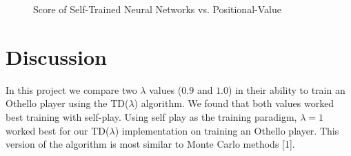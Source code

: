 \documentclass{sig-alternate-05-2015}
\begin{document}
\begin{figure}[p]
\centering
{}
\caption{Score of Self-Trained Neural Networks vs. Positional-Value}
\label{fig:graph5}
\end{figure}




\section{Discussion}

In this project we compare two  $\lambda$ values ($0.9$ and $1.0$) in their ability to train an Othello player using the TD($\lambda$) algorithm. We found that both values worked best training with self-play. Using self play as the training paradigm, $\lambda  = 1$ worked best for our TD($\lambda$) implementation on training an Othello player. This version of the algorithm is most similar to Monte Carlo methods [1].
\end{document}
